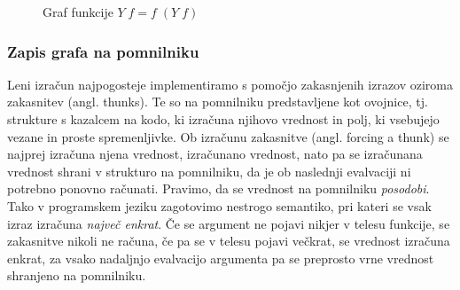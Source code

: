 \begin{figure*}[ht]
	\centering
	\begin{subfigure}[b]{0.45\textwidth}
		\centering
		\label{fig:funkcija-y-kot-prosta-spremenljivka}
	\end{subfigure}%
	\hfill
	\begin{subfigure}[b]{0.45\textwidth}
		\centering
		\label{fig:funkcija-y-kot-cikel}
	\end{subfigure}
	\caption{Graf funkcije $Y \; f = f \; (Y \; f)$}
	\label{fig:funkcija-y}
\end{figure*}

\subsubsection{Zapis grafa na pomnilniku}

Leni izračun najpogosteje implementiramo s pomočjo zakasnjenih izrazov oziroma zakasnitev (angl. thunks). Te so na pomnilniku predstavljene kot ovojnice, tj. strukture s kazalcem na kodo, ki izračuna njihovo vrednost in polj, ki vsebujejo vezane in proste spremenljivke. Ob izračunu zakasnitve (angl. forcing a thunk) se najprej izračuna njena vrednost, iz\-ra\-ču\-na\-no vrednost, nato pa se izračunana vrednost shrani v strukturo na pomnilniku, da je ob naslednji evalvaciji ni potrebno ponovno računati. Pravimo, da se vrednost na pomnilniku \emph{posodobi}. Tako v programskem jeziku zagotovimo nestrogo semantiko, pri kateri se vsak izraz izračuna \textit{največ enkrat}. Če se argument ne pojavi nikjer v telesu funkcije, se zakasnitve nikoli ne računa, če pa se v telesu pojavi večkrat, se vrednost izračuna enkrat, za vsako nadaljnjo evalvacijo argumenta pa se preprosto vrne vrednost shranjeno na pomnilniku.

